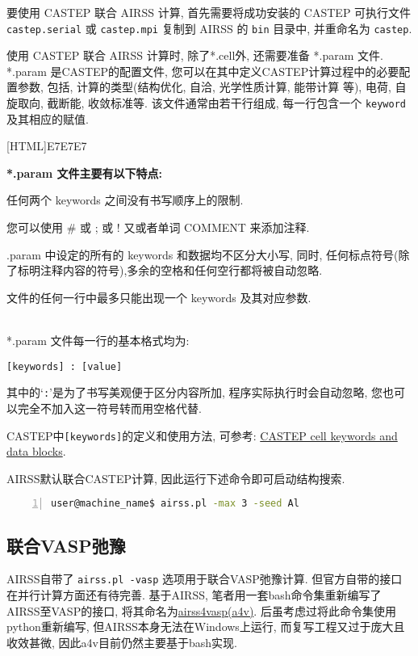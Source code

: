\documentclass[a4paper, 10pt]{article}
\begin{document}
要使用 CASTEP 联合 AIRSS 计算, 首先需要将成功安装的 CASTEP 可执行文件 \verb|castep.serial| 或 \verb|castep.mpi| 复制到 AIRSS 的 \verb|bin| 目录中, 并重命名为 \verb|castep|.

使用 CASTEP 联合 AIRSS 计算时, 除了*.cell外, 还需要准备 *.param 文件. *.param 是CASTEP的配置文件, 您可以在其中定义CASTEP计算过程中的必要配置参数, 包括, 计算的类型(结构优化, 自洽, 光学性质计算, 能带计算 等), 电荷, 自旋取向, 截断能, 收敛标准等. 该文件通常由若干行组成, 每一行包含一个 \verb|keyword| 及其相应的赋值.

\noindent{}[HTML]{E7E7E7}{\parbox{\textwidth}{%
\noindent \textbf{*.param 文件主要有以下特点:}
\begin{maineu}
\item 任何两个 keywords 之间没有书写顺序上的限制.
\item 您可以使用 \# 或 ; 或 ! 又或者单词 COMMENT 来添加注释.
\item *.param 中设定的所有的 keywords 和数据均不区分大小写, 同时, 任何标点符号(除了标明注释内容的符号),多余的空格和任何空行都将被自动忽略.
\item 文件的任何一行中最多只能出现一个 keywords 及其对应参数.
\end{maineu}}}\\

*.param 文件每一行的基本格式均为:
\begin{lstlisting}
[keywords] : [value]
\end{lstlisting}
其中的`\verb|:|'是为了书写美观便于区分内容所加, 程序实际执行时会自动忽略, 您也可以完全不加入这一符号转而用空格代替.

CASTEP中\verb|[keywords]|的定义和使用方法, 可参考: \href{http://www.tcm.phy.cam.ac.uk/castep/documentation/WebHelp/content/modules/castep/keywords/k_main_structure.htm}{CASTEP cell keywords and data blocks}.

AIRSS默认联合CASTEP计算, 因此运行下述命令即可启动结构搜索.
\begin{lstlisting}[language={bash},numbers=left]
user@machine_name$ airss.pl -max 3 -seed Al
\end{lstlisting}

\subsection{联合VASP弛豫}
AIRSS自带了 \verb|airss.pl -vasp| 选项用于联合VASP弛豫计算. 但官方自带的接口在并行计算方面还有待完善. 基于AIRSS, 笔者用一套bash命令集重新编写了AIRSS至VASP的接口, 将其命名为\href{https://github.com/kYangLi/airss4vasp}{airss4vasp(a4v)}. 后虽考虑过将此命令集使用python重新编写, 但AIRSS本身无法在Windows上运行, 而复写工程又过于庞大且收效甚微, 因此a4v目前仍然主要基于bash实现.
\end{document}
